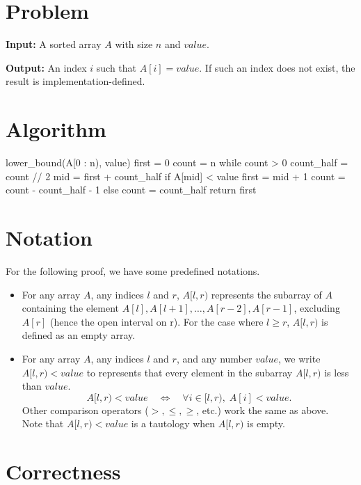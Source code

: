 \documentclass[12pt]{article}
\begin{document}
\section*{Problem}

\noindent\textbf{Input:} A sorted array \(A\) with size \(n\) and \(value\).

\noindent\textbf{Output:} An index \(i\) such that \(A[i] = value\). If such an index does not exist, the result is implementation-defined.

\section*{Algorithm}

\begin{pseudocode}
lower_bound(A[0 : n), value)
    first = 0
    count = n
    while count > 0
        count_half = count // 2
        mid = first + count_half
        if A[mid] < value
            first = mid + 1
            count = count - count_half - 1
        else
            count = count_half
    return first
\end{pseudocode}

\section*{Notation}

For the following proof, we have some predefined notations.
\begin{itemize}
    \item For any array \(A\), any indices \(l\) and \(r\), \(A[l, r)\) represents the subarray of \(A\) containing the element \(A[l], A[l+1], \dots, A[r-2], A[r-1]\), excluding \(A[r]\) (hence the open interval on r). For the case where \(l \geq r\), \(A[l, r)\) is defined as an empty array.
    \item For any array \(A\), any indices \(l\) and \(r\), and any number \(value\), we write \(A[l, r) < value\) to represents that every element in the subarray \(A[l, r)\) is less than \(value\).
    \[
        A[l, r) < value \quad \Longleftrightarrow \quad \forall i \in [l, r), \; A[i] < value.
    \]
    Other comparison operators (\(>, \leq, \geq\), etc.) work the same as above. \\
    Note that \(A[l, r) < value\) is a tautology when \(A[l, r)\) is empty.
\end{itemize}

\newpage

\section*{Correctness}
\end{document}
